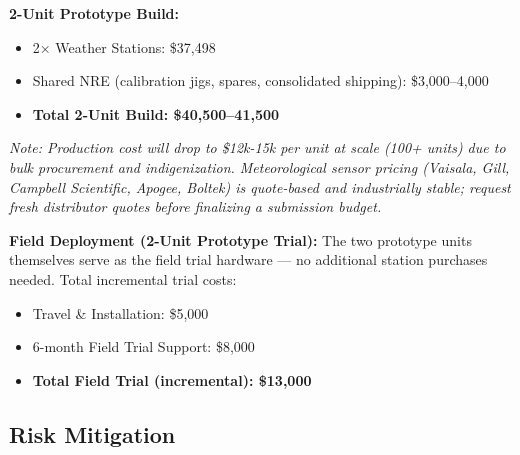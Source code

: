\textbf{2-Unit Prototype Build:}
\begin{itemize}
    \item 2× Weather Stations: \$37,498
    \item Shared NRE (calibration jigs, spares, consolidated shipping): \$3,000--4,000
    \item \textbf{Total 2-Unit Build: \$40,500--41,500}
\end{itemize}

\textit{Note: Production cost will drop to \$12k-15k per unit at scale (100+ units) due
to bulk procurement and indigenization. Meteorological sensor pricing (Vaisala, Gill,
Campbell Scientific, Apogee, Boltek) is quote-based and industrially stable; request
fresh distributor quotes before finalizing a submission budget.}

\textbf{Field Deployment (2-Unit Prototype Trial):}
The two prototype units themselves serve as the field trial hardware — no additional
station purchases needed. Total incremental trial costs:
\begin{itemize}
    \item Travel \& Installation: \$5,000
    \item 6-month Field Trial Support: \$8,000
    \item \textbf{Total Field Trial (incremental): \$13,000}
\end{itemize}

\subsection{Risk Mitigation}


